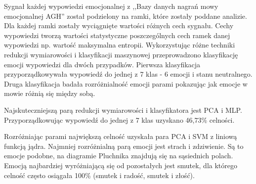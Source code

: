 \documentclass[a4paper,12pt,twoside,openany]{report}
\begin{document}
Sygnał każdej wypowiedzi emocjonalnej z ,,Bazy danych nagrań mowy emocjonalnej AGH'' został podzielony na ramki, które zostały poddane analizie.
Dla każdej ramki zostały wyciągnięte wartości różnych cech sygnału. 
Cechy wypowiedzi tworzą wartości statystyczne poszczególnych cech ramek danej wypowiedzi np. wartość maksymalna entropii.
Wykorzystując różne techniki redukcji wymiarowości i klasyfikacji maszynowej przeprowadzono klasyfikację emocji wypowiedzi dla dwóch przypadków.
Pierwsza klasyfikacja przyporządkowywała wypowiedź do jednej z 7 klas - 6 emocji i stanu neutralnego.
Druga klasyfikacja badała rozróżnialność emocji parami pokazując jak emocje w mowie różnią się między sobą.

Najskuteczniejszą parą redukcji wymiarowości i klasyfikatora jest PCA i MLP. 
Przyporządkowując wypowiedź do jednej z 7 klas uzyskano 46,73\% celności.

Rozróżniając parami największą celność uzyskała para PCA i SVM z liniową funkcją jądra.
Najmniej rozróżnialną parą emocji jest strach i zdziwienie. 
Są to emocje podobne, na diagramie Pluchnika znajdują się na sąsiednich polach.
Emocją najbardziej wyróżniającą się od pozostałych jest smutek, 
dla którego celność często osiągała 100\% (smutek i radość, smutek i złość).


{}
\end{document}
